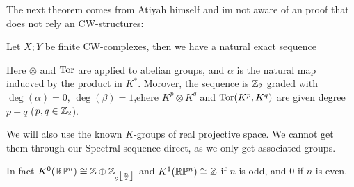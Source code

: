 The next theorem comes from Atiyah himself and im not aware of an proof that does not rely an CW-structures:

\begin{theorem}
    Let $X;Y$ be finite CW-complexes, then we have a natural exact sequence
    \begin{center}
    \end{center}
    Here $\otimes$ and $\operatorname{\mathrm{Tor}}$ are applied to abelian groups, and $\alpha$ is the natural map inducved by the product in $K^*$. Morover, the sequence is $\mathbb{Z}_2$ graded with $\deg(\alpha)=0$, $\deg(\beta)=1$,ehere $K^p\otimes K^q$ and $\operatorname{\mathrm{Tor}}(K^p,K^q)$ are given degree $p+q$ ($p,q\in \mathbb{Z}_2$). 
\end{theorem}
We will also use the known $K$-groups of real projective space. We cannot get them through our Spectral sequence direct, as we only get associated groups.
	\begin{fact}
		In fact $K^0(\mathbb{R}\mathbb{P}^n)\cong \mathbb{Z} \oplus \mathbb{Z}_{2^{\left\lfloor \frac{n}{2}\right\rfloor}}$ and $K^1(\mathbb{R}\mathbb{P}^n)\cong \mathbb{Z}$ if $n$ is odd, and $0$ if $n$ is even.
	\end{fact}

